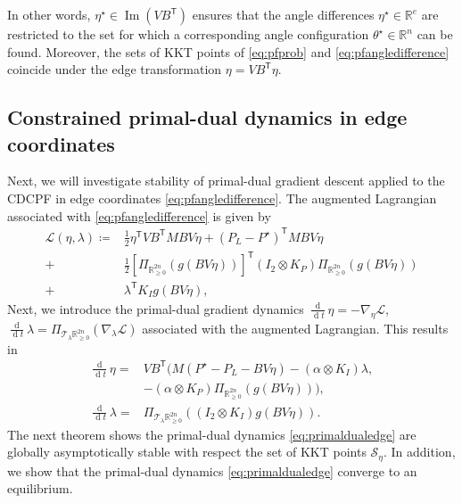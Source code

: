 \documentclass[twocolumn,twoside,journal]{IEEEtran}
\DeclareMathOperator{\diff}{d}
\DeclareMathOperator{\Ima}{Im}
\newcommand{\mc}{\mathcal}
\newcommand{\ddt}{\tfrac{\diff}{\diff \!t}}
\begin{document}
In other words, $\eta^\star \in \Ima (VB^\mathsf{T})$ ensures that the angle differences $\eta^\star \in \mathbb{R}^e$ are restricted to the set for which a corresponding  angle configuration $\theta^\star \in \mathbb{R}^n$ can be found. Moreover, the sets of KKT points of \eqref{eq:pfprob} and \eqref{eq:pfangledifference} coincide under the edge transformation $\eta = VB^\mathsf{T} \eta$. 



\subsection{Constrained primal-dual dynamics in edge coordinates}
Next, we will investigate stability of primal-dual gradient descent applied to the CDCPF in edge coordinates \eqref{eq:pfangledifference}. The augmented Lagrangian associated with \eqref{eq:pfangledifference} is given by
\begin{align*}
    \mathcal{L}(\eta, \lambda)\coloneqq&\frac{1}{2} \eta^{\mathsf{T}} VB^\mathsf{T}MBV \eta+\left(P_L-P^\star\right)^{\mathsf{T}} M BV \eta \\
    +&\frac{1}{2} \left[\Pi_{\mathbb{R}_{\geq 0}^{2n}} \left(g(BV\eta)\right)\right]^\mathsf{T} (I_2 \otimes K_P)\Pi_{\mathbb{R}_{\geq 0}^{2n}} \left(g(BV\eta)\right)\\ +& \lambda^\mathsf{T} K_I  g(BV\eta),
    \end{align*}
Next, we introduce the primal-dual gradient dynamics $\ddt\eta = -\nabla_{\eta} \mathcal{L}$, $\ddt\lambda = \Pi_{\mathcal{T}_{\lambda} \mathbb{R}^{2n}_{\geq 0}} \left(\nabla_{\lambda}\mathcal{L}\right)$ associated with the augmented Lagrangian. This results in  
\begin{subequations}\label{eq:primaldualedge}
    \begin{align}
        \ddt\eta =&   VB^\mathsf{T} (M(P^\star-P_L - BV\eta) -  (\alpha \otimes K_I)\lambda,  \label{eq:primaldualedge:angle} \\
        & - \left(\alpha \otimes K_P\right) \Pi_{{\mathbb{R}}^{2n}_{\geq 0} }\left(g(BV\eta)\right)), \nonumber \\
        \ddt\lambda =&    \Pi_{\mathcal{T}_{\lambda} \mathbb{R}^{2n}_{\geq 0}} \left((I_2 \otimes K_I) g(BV\eta)\right).
    \end{align}
\end{subequations}
The next theorem shows the primal-dual dynamics \eqref{eq:primaldualedge} are globally asymptotically stable with respect the set of KKT points $\mc S_{\eta}$. In addition, we show that the primal-dual dynamics \eqref{eq:primaldualedge} converge to an equilibrium.
\end{document}
